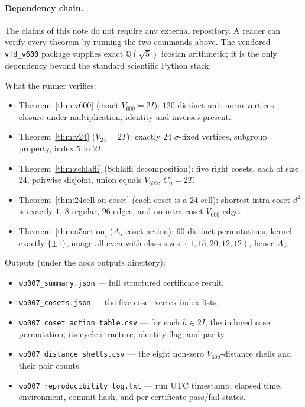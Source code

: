 \documentclass[11pt]{article}
\newcommand{\Vsix}{V_{600}}
\newcommand{\Vtwentyfour}{V_{24}}
\newcommand{\twoI}{2I}
\newcommand{\twoT}{2T}
\theoremstyle{plain}
\theoremstyle{definition}
\begin{document}
\paragraph{Dependency chain.}
The claims of this note do not require any external repository.  A
reader can verify every theorem by running the two commands above.
The vendored \texttt{vfd\_v600} package supplies exact
$\mathbb{Q}(\sqrt 5)$ icosian arithmetic; it is the only dependency
beyond the standard scientific Python stack.

\medskip
\noindent What the runner verifies:
\begin{itemize}
  \item Theorem~\ref{thm:v600} (exact $\Vsix = \twoI$):
        $120$ distinct unit-norm vertices, closure under
        multiplication, identity and inverses present.
  \item Theorem~\ref{thm:v24} ($\Vtwentyfour = \twoT$): exactly
        $24$ $\sigma$-fixed vertices, subgroup property, index $5$
        in $\twoI$.
  \item Theorem~\ref{thm:schlafli} (Schl\"afli decomposition):
        five right cosets, each of size $24$, pairwise disjoint,
        union equals $\Vsix$, $C_0 = \twoT$.
  \item Theorem~\ref{thm:24cell-on-coset} (each coset is a
        24-cell): shortest intra-coset $d^2$ is exactly $1$,
        $8$-regular, $96$ edges, and no intra-coset
        $\Vsix$-edge.
  \item Theorem~\ref{thm:a5action} ($A_5$ coset action): $60$
        distinct permutations, kernel exactly $\{\pm 1\}$, image
        all even with class sizes $(1, 15, 20, 12, 12)$, hence
        $A_5$.
\end{itemize}

Outputs (under the docs outputs directory):
\begin{itemize}
  \item \texttt{wo007\_summary.json} --- full structured
        certificate result.
  \item \texttt{wo007\_cosets.json} --- the five coset vertex-index
        lists.
  \item \texttt{wo007\_coset\_action\_table.csv} --- for each
        $h\in\twoI$, the induced coset permutation, its cycle
        structure, identity flag, and parity.
  \item \texttt{wo007\_distance\_shells.csv} --- the eight non-zero
        $\Vsix$-distance shells and their pair counts.
  \item \texttt{wo007\_reproducibility\_log.txt} --- run UTC
        timestamp, elapsed time, environment, commit hash, and
        per-certificate pass/fail states.
\end{itemize}
\end{document}
